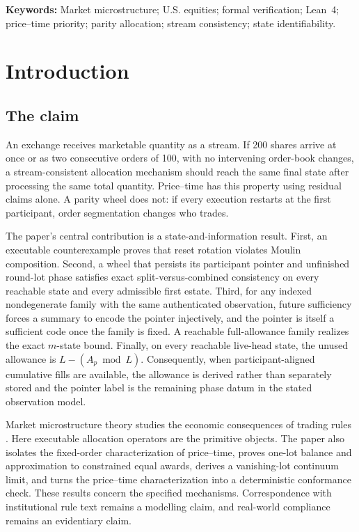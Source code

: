 \documentclass[11pt]{article}
\theoremstyle{definition}
\theoremstyle{remark}
\begin{document}
\noindent\textbf{Keywords:} Market microstructure; U.S. equities; formal verification; Lean~4; price--time priority; parity allocation; stream consistency; state identifiability.

\clearpage
{}
\tableofcontents
\clearpage

\section{Introduction}

\subsection{The claim}
An exchange receives marketable quantity as a stream. If 200 shares arrive at once or as two consecutive orders of 100, with no intervening order-book changes, a stream-consistent allocation mechanism should reach the same final state after processing the same total quantity. Price--time has this property using residual claims alone. A parity wheel does not: if every execution restarts at the first participant, order segmentation changes who trades.

The paper's central contribution is a state-and-information result. First, an executable counterexample proves that reset rotation violates Moulin composition. Second, a wheel that persists its participant pointer and unfinished round-lot phase satisfies exact split-versus-combined consistency on every reachable state and every admissible first estate. Third, for any indexed nondegenerate family with the same authenticated observation, future sufficiency forces a summary to encode the pointer injectively, and the pointer is itself a sufficient code once the family is fixed. A reachable full-allowance family realizes the exact $m$-state bound. Finally, on every reachable live-head state, the unused allowance is $L-(A_p\bmod L)$. Consequently, when participant-aligned cumulative fills are available, the allowance is derived rather than separately stored and the pointer label is the remaining phase datum in the stated observation model.

Market microstructure theory studies the economic consequences of trading rules \citep{ohara1995market,parlour1998price,harris2003trading}. Here executable allocation operators are the primitive objects. The paper also isolates the fixed-order characterization of price--time, proves one-lot balance and approximation to constrained equal awards, derives a vanishing-lot continuum limit, and turns the price--time characterization into a deterministic conformance check. These results concern the specified mechanisms. Correspondence with institutional rule text remains a modelling claim, and real-world compliance remains an evidentiary claim.
\end{document}
